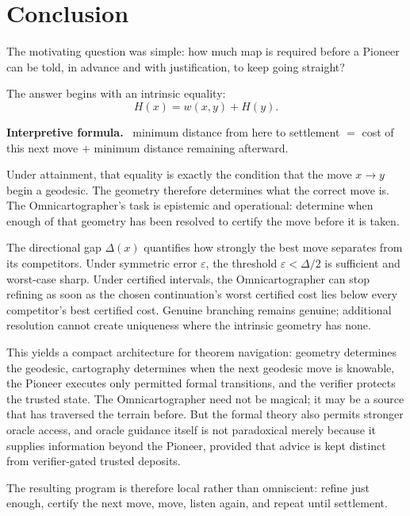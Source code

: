 \documentclass[11pt]{article}
\theoremstyle{definition}
\theoremstyle{remark}
\newcommand{\Gap}{\Delta}
\newcommand{\eps}{\varepsilon}
\newenvironment{interpretiveformula}{%
  \begin{center}\begin{minipage}{0.92\textwidth}\small
  \textbf{Interpretive formula.}\ }{\end{minipage}\end{center}}
\begin{document}
\section{Conclusion}
The motivating question was simple: how much map is required before a Pioneer can be told, in advance and with justification, to keep going straight?

The answer begins with an intrinsic equality:
\[
\boxed{H(x)=w(x,y)+H(y).}
\]

\begin{interpretiveformula}
minimum distance from here to settlement $=$ cost of this next move $+$ minimum distance remaining afterward.
\end{interpretiveformula}

Under attainment, that equality is exactly the condition that the move $x\to y$ begin a geodesic. The geometry therefore determines what the correct move is. The Omnicartographer's task is epistemic and operational: determine when enough of that geometry has been resolved to certify the move before it is taken.

The directional gap $\Gap(x)$ quantifies how strongly the best move separates from its competitors. Under symmetric error $\eps$, the threshold $\eps<\Gap/2$ is sufficient and worst-case sharp. Under certified intervals, the Omnicartographer can stop refining as soon as the chosen continuation's worst certified cost lies below every competitor's best certified cost. Genuine branching remains genuine; additional resolution cannot create uniqueness where the intrinsic geometry has none.

This yields a compact architecture for theorem navigation: geometry determines the geodesic, cartography determines when the next geodesic move is knowable, the Pioneer executes only permitted formal transitions, and the verifier protects the trusted state. The Omnicartographer need not be magical; it may be a source that has traversed the terrain before. But the formal theory also permits stronger oracle access, and oracle guidance itself is not paradoxical merely because it supplies information beyond the Pioneer, provided that advice is kept distinct from verifier-gated trusted deposits.

The resulting program is therefore local rather than omniscient: refine just enough, certify the next move, move, listen again, and repeat until settlement.
\end{document}
